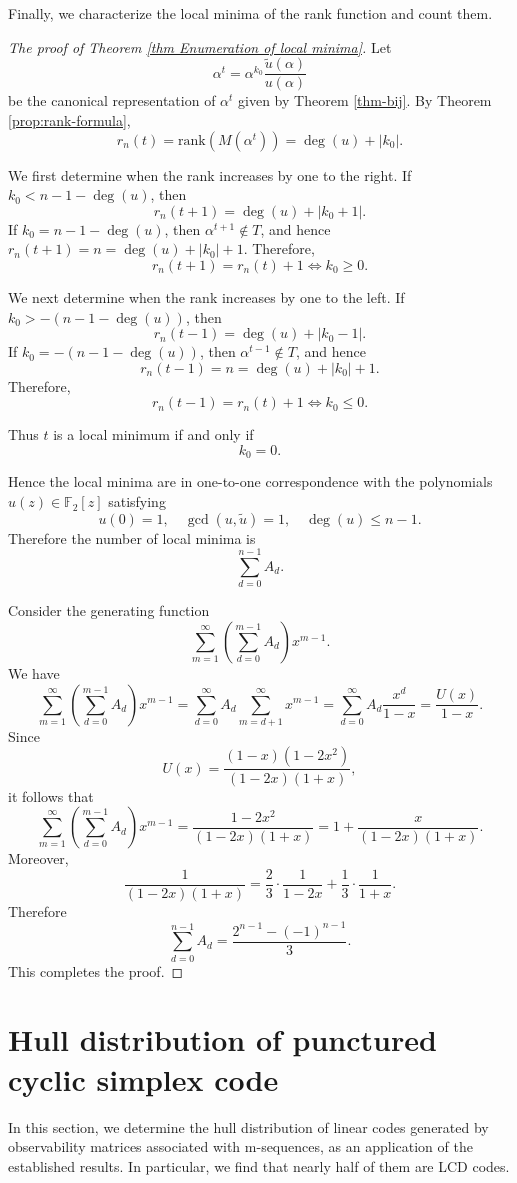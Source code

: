 \documentclass[hidelinks,onefignum,onetabnum]{siamart251216}
\theoremstyle{definition}
\theoremstyle{remark}
\providecommand{\rank}{{\mathrm{rank}}}
\providecommand{\F}{{\mathbb{F}}}
\begin{document}
Finally, we characterize the local minima of the rank function and count them.



\begin{proof}[The proof of Theorem \ref{thm Enumeration of local minima}]
	Let
	\[
	\alpha^t=\alpha^{k_0}\frac{\widetilde u(\alpha)}{u(\alpha)}
	\]
	be the canonical representation of $\alpha^t$ given by Theorem \ref{thm-bij}. By Theorem \ref{prop:rank-formula},
	\[
	r_n(t)=\rank(M(\alpha^t))=\deg(u)+|k_0|.
	\]
	
	We first determine when the rank increases by one to the right. If $k_0<n-1-\deg(u)$, then
	\[
	r_n(t+1)=\deg(u)+|k_0+1|.
	\]
	If $k_0=n-1-\deg(u)$, then $\alpha^{t+1}\notin T$, and hence $r_n(t+1)=n=\deg(u)+|k_0|+1$. Therefore,
	\[
	r_n(t+1)=r_n(t)+1
	\iff k_0\ge 0.
	\]
	
	We next determine when the rank increases by one to the left. If $	k_0>-(n-1-\deg(u))$, then
	\[
	r_n(t-1)=\deg(u)+|k_0-1|.
	\]
	If $k_0=-(n-1-\deg(u))$, then $\alpha^{t-1}\notin T$, and hence
	\[
	r_n(t-1)=n=\deg(u)+|k_0|+1.
	\]
	Therefore,
	\[
	r_n(t-1)=r_n(t)+1
	\iff k_0\le 0.
	\]
	
	Thus $t$ is a local minimum if and only if
	\[
	k_0=0.
	\]
	
	Hence the local minima are in one-to-one correspondence with the polynomials
	$u(z)\in\F_2[z]$ satisfying
	\[
	u(0)=1,\quad \gcd(u,\widetilde u)=1,\quad \deg(u)\le n-1.
	\]
	Therefore the number of local minima is
	\[
	\sum_{d=0}^{n-1}A_d.
	\]
	
	Consider the generating function
	\[
	\sum_{m=1}^\infty \left(\sum_{d=0}^{m-1} A_d\right)x^{m-1}.
	\]
	We have
	\[
	\sum_{m=1}^\infty \left(\sum_{d=0}^{m-1} A_d\right)x^{m-1}
	=\sum_{d=0}^\infty A_d\sum_{m=d+1}^\infty x^{m-1}
	=\sum_{d=0}^\infty A_d\frac{x^d}{1-x}
	=\frac{U(x)}{1-x}.
	\]
	Since
	\[
	U(x)=\frac{(1-x)(1-2x^2)}{(1-2x)(1+x)},
	\]
	it follows that
	\[
	\sum_{m=1}^\infty \left(\sum_{d=0}^{m-1} A_d\right)x^{m-1}
	=\frac{1-2x^2}{(1-2x)(1+x)}
	=1+\frac{x}{(1-2x)(1+x)}.
	\]
	Moreover,
	\[
	\frac{1}{(1-2x)(1+x)}
	=\frac{2}{3}\cdot\frac{1}{1-2x}+\frac{1}{3}\cdot\frac{1}{1+x}.
	\]
	Therefore
	\[
	\sum_{d=0}^{n-1} A_d=\frac{2^{n-1}-(-1)^{n-1}}{3}.
	\]
	This completes the proof.
\end{proof}


\section{Hull distribution of punctured cyclic simplex code}\label{sec-LCD}
In this section, we determine the hull distribution of linear codes generated by observability matrices associated with m-sequences, as an application of the established results. In particular, we find that nearly half of them are LCD codes.
\end{document}
